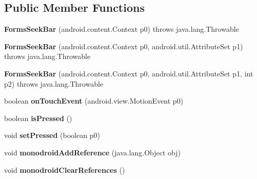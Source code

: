 \subsection*{Public Member Functions}
\begin{DoxyCompactItemize}
\item 
\mbox{\label{classmd5b60ffeb829f638581ab2bb9b1a7f4f3f_1_1FormsSeekBar_a702512b58f3e4e250bf52ad5c064f83a}} 
{\bfseries Forms\+Seek\+Bar} (android.\+content.\+Context p0)  throws java.\+lang.\+Throwable 	
\item 
\mbox{\label{classmd5b60ffeb829f638581ab2bb9b1a7f4f3f_1_1FormsSeekBar_a2fed7f17c8acbe1d59dd917b841b8a23}} 
{\bfseries Forms\+Seek\+Bar} (android.\+content.\+Context p0, android.\+util.\+Attribute\+Set p1)  throws java.\+lang.\+Throwable 	
\item 
\mbox{\label{classmd5b60ffeb829f638581ab2bb9b1a7f4f3f_1_1FormsSeekBar_a2c2467e8fb04433f1c7a2333d4893891}} 
{\bfseries Forms\+Seek\+Bar} (android.\+content.\+Context p0, android.\+util.\+Attribute\+Set p1, int p2)  throws java.\+lang.\+Throwable 	
\item 
\mbox{\label{classmd5b60ffeb829f638581ab2bb9b1a7f4f3f_1_1FormsSeekBar_a2a80911e4812d35846f878170806ba84}} 
boolean {\bfseries on\+Touch\+Event} (android.\+view.\+Motion\+Event p0)
\item 
\mbox{\label{classmd5b60ffeb829f638581ab2bb9b1a7f4f3f_1_1FormsSeekBar_a5ba10e44e1797cb266b3fa57c4604e42}} 
boolean {\bfseries is\+Pressed} ()
\item 
\mbox{\label{classmd5b60ffeb829f638581ab2bb9b1a7f4f3f_1_1FormsSeekBar_a3e8785634191b0032360570d26a6cd8a}} 
void {\bfseries set\+Pressed} (boolean p0)
\item 
\mbox{\label{classmd5b60ffeb829f638581ab2bb9b1a7f4f3f_1_1FormsSeekBar_a3501991d7e241e3974a47f91a20a02ec}} 
void {\bfseries monodroid\+Add\+Reference} (java.\+lang.\+Object obj)
\item 
\mbox{\label{classmd5b60ffeb829f638581ab2bb9b1a7f4f3f_1_1FormsSeekBar_ab7e97d04898da771ddfe5cbc716b8d87}} 
void {\bfseries monodroid\+Clear\+References} ()
\end{DoxyCompactItemize}
